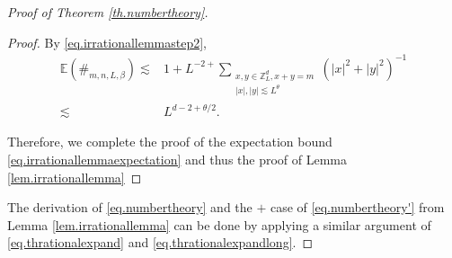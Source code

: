 \begin{proof}[Proof of Theorem \ref{th.numbertheory}]
\begin{proof}
By \eqref{eq.irrationallemmastep2},
\begin{equation}
\begin{split}
    \mathbb{E}(\#_{m,n,L,\beta})\lesssim & 1+L^{-2+}\sum_{\substack{x,y\in\mathbb{Z}^d_L,x+y=m \\ |x|,|y|\lesssim L^{\theta}}}  (|x|^2+|y|^2)^{-1}    
    \\
    \lesssim& L^{d-2+\theta/2}.
\end{split}
\end{equation}

Therefore, we complete the proof of the expectation bound \eqref{eq.irrationallemmaexpectation} and thus the proof of Lemma \ref{lem.irrationallemma}
\end{proof}





The derivation of \eqref{eq.numbertheory} and the $+$ case of \eqref{eq.numbertheory'} from Lemma \ref{lem.irrationallemma} can be done by applying a similar argument of \eqref{eq.thrationalexpand} and \eqref{eq.thrationalexpandlong}.
\end{proof}
